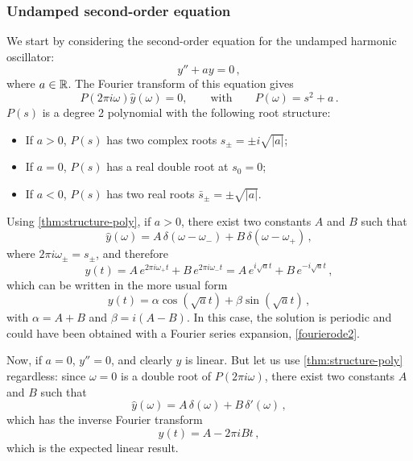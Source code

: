 \subsubsection{Undamped second-order equation}
We start by considering the second-order equation for the undamped harmonic oscillator:
\begin{equation}
  y''+ay=0\,,
\end{equation}
where $a\in\mathbb{R}$. The Fourier transform of this equation gives
\begin{equation}
  P(2\pi i\omega)\hat{y}(\omega)=0,\qquad\text{with}\qquad P(\omega)=s^2+a\,.
\end{equation}
$P(s)$ is a degree 2 polynomial with the following root structure:
\begin{itemize}
  \item If $a>0$, $P(s)$ has two complex roots $s_{\pm}=\pm i\sqrt{|a|}$;
  \item If $a=0$, $P(s)$ has a real double root at $s_0=0$;
  \item If $a<0$, $P(s)$ has two real roots $\bar{s}_{\pm}=\pm\sqrt{|a|}$.
\end{itemize}
Using \cref{thm:structure-poly}, if $a>0$, there exist two constants $A$ and $B$ such
that
\begin{equation}
  \hat{y}(\omega)=A\,\delta(\omega-\omega_-)+B\,\delta(\omega-\omega_+)\,,
\end{equation}
where $2\pi i\omega_{\pm}=s_\pm$, and therefore
\begin{equation}
  y(t)=A\,e^{2\pi i\omega_+t}+B\,e^{2\pi i\omega_-t}=A\,e^{i\sqrt{a}t}+B\,e^{-i\sqrt{a}t}\,,
  \label{eq:ode2-periodic}
\end{equation}
which can be written in the more usual form
\begin{equation}
  y(t)=\alpha\cos(\sqrt{a}t)+\beta\sin(\sqrt{a}t)\,,
\end{equation}
with $\alpha=A+B$ and $\beta=i(A-B)$. In this case, the solution is periodic and could
have been obtained with a Fourier series expansion, \cf\cref{fourierode2}.

Now, if $a=0$, $y''=0$, and clearly $y$ is linear. But let us use
\cref{thm:structure-poly} regardless: since $\omega=0$ is a double root of $P(2\pi
  i\omega)$, there exist two constants $A$ and $B$ such that
\begin{equation}
  \hat{y}(\omega)=A\,\delta(\omega)+B\,\delta'(\omega)\,,
\end{equation}
which has the inverse Fourier transform
\begin{equation}
  y(t)=A-2\pi i Bt\,,
\end{equation}
which is the expected linear result.

